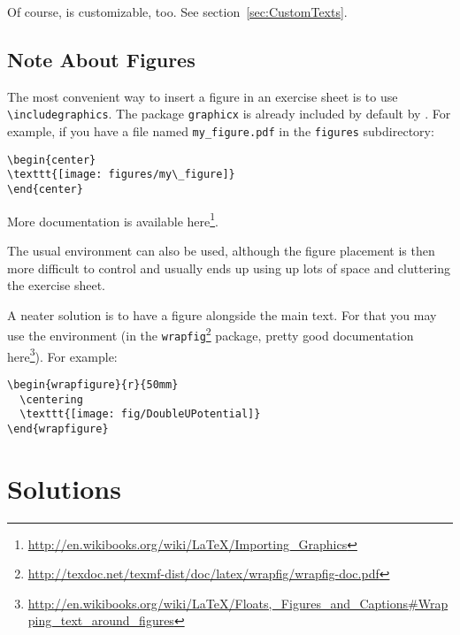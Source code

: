 \documentclass[11pt,a4paper]{article}
\begin{document}
\begin{pkgtip}
  Of course,  is customizable, too. See section~\ref{sec:CustomTexts}.
\end{pkgtip}

\subsection{Note About Figures}

The most convenient way to insert a figure in an exercise sheet is to use
\verb|\includegraphics|. The package \texttt{graphicx} is already included by default by
\ethuebung{}. For example, if you have a file named \verb|my_figure.pdf| in the
\verb|figures| subdirectory:
\begin{pkgverbatim}
\begin{verbatim}
\begin{center}
\texttt{[image: figures/my\_figure]}
\end{center}
\end{verbatim}
\end{pkgverbatim}

More documentation is available
here\footnote{\url{http://en.wikibooks.org/wiki/LaTeX/Importing_Graphics}}.

The usual  environment can also be used, although the figure placement is
then more difficult to control and usually ends up using up lots of space and cluttering
the exercise sheet.

A neater solution is to have a figure alongside the main text. For that you may use the
 environment (in the
\texttt{wrapfig}\footnote{\url{http://texdoc.net/texmf-dist/doc/latex/wrapfig/wrapfig-doc.pdf}}
package, pretty good documentation
here\footnote{\url{http://en.wikibooks.org/wiki/LaTeX/Floats,_Figures_and_Captions\#Wrapping_text_around_figures}}).
For example:
\begin{pkgverbatim}
\begin{verbatim}
\begin{wrapfigure}{r}{50mm}
  \centering
  \texttt{[image: fig/DoubleUPotential]}
\end{wrapfigure}
\end{verbatim}
\end{pkgverbatim}



\section{Solutions}
\label{sec:Solutions}
\end{document}
